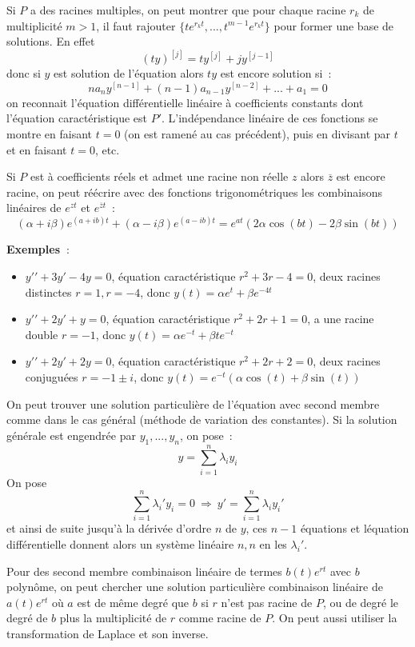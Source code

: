 \documentclass[a4paper,11pt]{article}
\begin{document}
Si $P$ a des racines multiples, on peut montrer que pour chaque
racine $r_k$ de multiplicit\'e $m>1$, il faut rajouter
$\{ te^{r_kt}, ..., t^{m-1} e^{r_kt} \}$ pour former une base
de solutions. En effet
$$ (ty)^{[j]} = t y^{[j]} + j y^{[j-1]}$$
donc si $y$ est solution de l'\'equation alors $ty$ est encore solution
si~:
$$na_n y^{[n-1]} + (n-1)a_{n-1} y^{[n-2]}+...+a_1=0$$
on reconnait l'\'equation diff\'erentielle lin\'eaire \`a coefficients
constants dont l'\'equation caract\'eristique est $P'$.
L'ind\'ependance lin\'eaire de ces fonctions
se montre en faisant $t=0$ (on est ramen\'e au cas pr\'ec\'edent), 
puis en divisant par $t$ et en faisant $t=0$, etc.

Si $P$ est \`a coefficients r\'eels et admet une racine non r\'eelle
$z$ alors $\overline{z}$ est encore racine, on peut r\'e\'ecrire 
avec des fonctions trigonom\'etriques
les combinaisons lin\'eaires de $e^{zt}$ et $e^{\overline{z}t}$~:
$$ (\alpha + i \beta) e^{(a+ib)t} + (\alpha - i \beta)  e^{(a-ib)t}
=  e^{at} ( 2 \alpha \cos(bt) - 2 \beta \sin(bt) )$$

{\bf Exemples~}: 
\begin{itemize}
\item $y'{'}+3y'-4y=0$, \'equation caract\'eristique $r^2+3r-4=0$,
deux racines distinctes $r=1, r=-4$, donc $y(t)=\alpha e^t+\beta e^{-4t}$
\item $y'{'}+2y'+y=0$, \'equation caract\'eristique $r^2+2r+1=0$,
a une racine double $r=-1$, donc $y(t)=\alpha e^{-t}+\beta t e^{-t}$
\item $y'{'}+2y'+2y=0$, \'equation caract\'eristique $r^2+2r+2=0$,
deux racines conjugu\'ees $r=-1\pm i$, donc
$y(t)=e^{-t}(\alpha \cos(t)+\beta \sin(t))$
\end{itemize}

On peut trouver une solution particuli\`ere de l'\'equation avec
second membre comme dans le cas g\'en\'eral (m\'ethode de variation
des constantes). Si la solution g\'en\'erale est engendr\'ee par
$y_1,...,y_n$, on pose~:
$$ y=\sum_{i=1}^n \lambda_i y_i$$
On pose
$$ \sum_{i=1}^n \lambda_i' y_i=0 \ \Rightarrow \ 
y'=\sum_{i=1}^n \lambda_i y_i'$$
et ainsi de suite jusqu'\`a la d\'eriv\'ee d'ordre $n$ de $y$, ces
$n-1$ \'equations et l\'equation diff\'erentielle donnent 
alors un syst\`eme lin\'eaire $n,n$ en
les $\lambda_i'$.

Pour des second membre combinaison lin\'eaire
de termes $b(t)e^{rt}$ avec $b$ polyn\^ome,
on peut chercher une solution particuli\`ere
combinaison lin\'eaire de $a(t)e^{rt}$ o\`u $a$ est de m\^eme
degr\'e que $b$ si $r$ n'est pas racine de $P$, ou de degr\'e le
degr\'e de $b$ plus la multiplicit\'e de $r$ comme racine de $P$.
On peut aussi utiliser la transformation de Laplace et son inverse.
\end{document}
